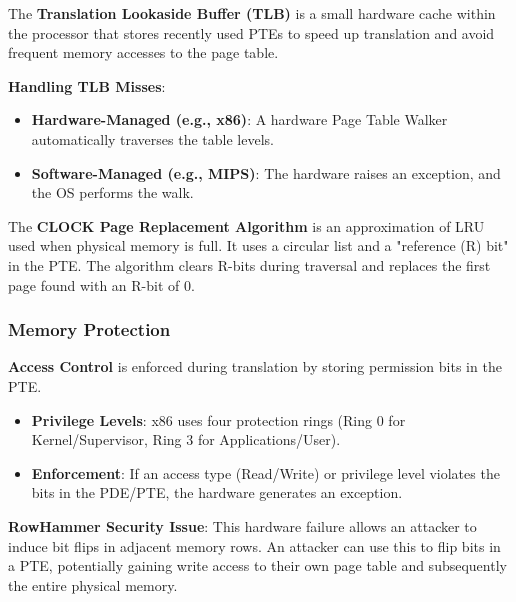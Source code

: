\begin{definition}
	The \textbf{Translation Lookaside Buffer (TLB)} is a small hardware cache within the processor that stores recently used PTEs to speed up translation and avoid frequent memory accesses to the page table.
\end{definition}

\begin{example}
	\textbf{Handling TLB Misses}:
	\begin{itemize}
		\item \textbf{Hardware-Managed (e.g., x86)}: A hardware Page Table Walker automatically traverses the table levels.
		\item \textbf{Software-Managed (e.g., MIPS)}: The hardware raises an exception, and the OS performs the walk.
	\end{itemize}
\end{example}

\begin{definition}
	The \textbf{CLOCK Page Replacement Algorithm} is an approximation of LRU used when physical memory is full. It uses a circular list and a "reference (R) bit" in the PTE. The algorithm clears R-bits during traversal and replaces the first page found with an R-bit of 0.
\end{definition}

\subsubsection{Memory Protection}

\begin{remark}
	\textbf{Access Control} is enforced during translation by storing permission bits in the PTE.
	\begin{itemize}
		\item \textbf{Privilege Levels}: x86 uses four protection rings (Ring 0 for Kernel/Supervisor, Ring 3 for Applications/User).
		\item \textbf{Enforcement}: If an access type (Read/Write) or privilege level violates the bits in the PDE/PTE, the hardware generates an exception.
	\end{itemize}
\end{remark}

\begin{remark}
	\textbf{RowHammer Security Issue}: This hardware failure allows an attacker to induce bit flips in adjacent memory rows. An attacker can use this to flip bits in a PTE, potentially gaining write access to their own page table and subsequently the entire physical memory.
\end{remark}

